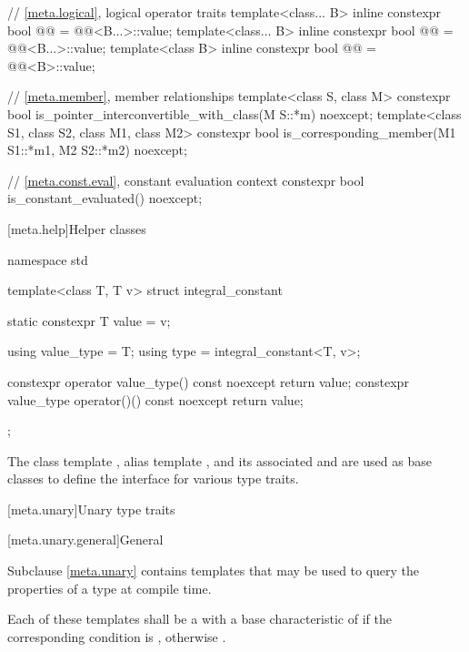 \begin{codeblock}
{  // \ref{meta.logical}, logical operator traits
  template<class... B>
    inline constexpr bool @@ = @@<B...>::value;
  template<class... B>
    inline constexpr bool @@ = @@<B...>::value;
  template<class B>
    inline constexpr bool @@ = @@<B>::value;

  // \ref{meta.member}, member relationships
  template<class S, class M>
    constexpr bool is_pointer_interconvertible_with_class(M S::*m) noexcept;
  template<class S1, class S2, class M1, class M2>
    constexpr bool is_corresponding_member(M1 S1::*m1, M2 S2::*m2) noexcept;

  // \ref{meta.const.eval}, constant evaluation context
  constexpr bool is_constant_evaluated() noexcept;
}
\end{codeblock}

[meta.help]{Helper classes}

%
%
\begin{codeblock}
namespace std {
  template<class T, T v> struct integral_constant {
    static constexpr T value = v;

    using value_type = T;
    using type = integral_constant<T, v>;

    constexpr operator value_type() const noexcept { return value; }
    constexpr value_type operator()() const noexcept { return value; }
  };
}
\end{codeblock}

%
%
%
%
\pnum
The class template ,
alias template , and
its associated 
 and 
are used as base classes to define
the interface for various type traits.

[meta.unary]{Unary type traits}

[meta.unary.general]{General}

\pnum
Subclause \ref{meta.unary} contains templates that may be used to query the
properties of a type at compile time.

\pnum
Each of these templates shall be a
with a base characteristic of
 if the corresponding condition is , otherwise
.

